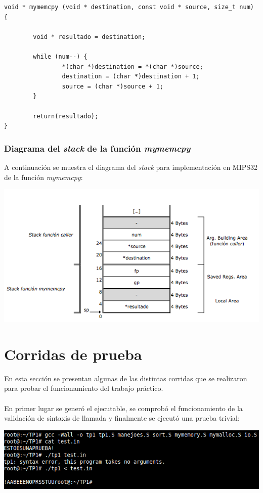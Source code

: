 \documentclass[a4paper,10pt]{article}
\begin{document}
{\footnotesize \begin{verbatim}
void * mymemcpy (void * destination, const void * source, size_t num) {

        void * resultado = destination;

        while (num--) {
                *(char *)destination = *(char *)source;
                destination = (char *)destination + 1;
                source = (char *)source + 1;
        }

        return(resultado);
}
\end{verbatim}}

\subsubsection{Diagrama del \textit{stack} de la funci\'on \textit{mymemcpy}}
A continuaci\'on se muestra el diagrama del \textit{stack} para implementaci\'on en MIPS32 de la funci\'on \textit{mymemcpy}:

\begin{center}
\includegraphics[scale=0.50]{stack_mymemcpy.png}
\end{center}

\pagebreak

\section{Corridas de prueba}
En esta secci\'on se presentan algunas de las distintas corridas que se realizaron para probar el funcionamiento del trabajo pr\'actico.\\
\\
En primer lugar se gener\'o el ejecutable, se comprob\'o el funcionamiento de la validaci\'on de sintaxis de llamada y finalmente se ejecut\'o una prueba trivial:
\begin{center}
\includegraphics[scale=0.60]{1.png}
\end{center}
\end{document}

